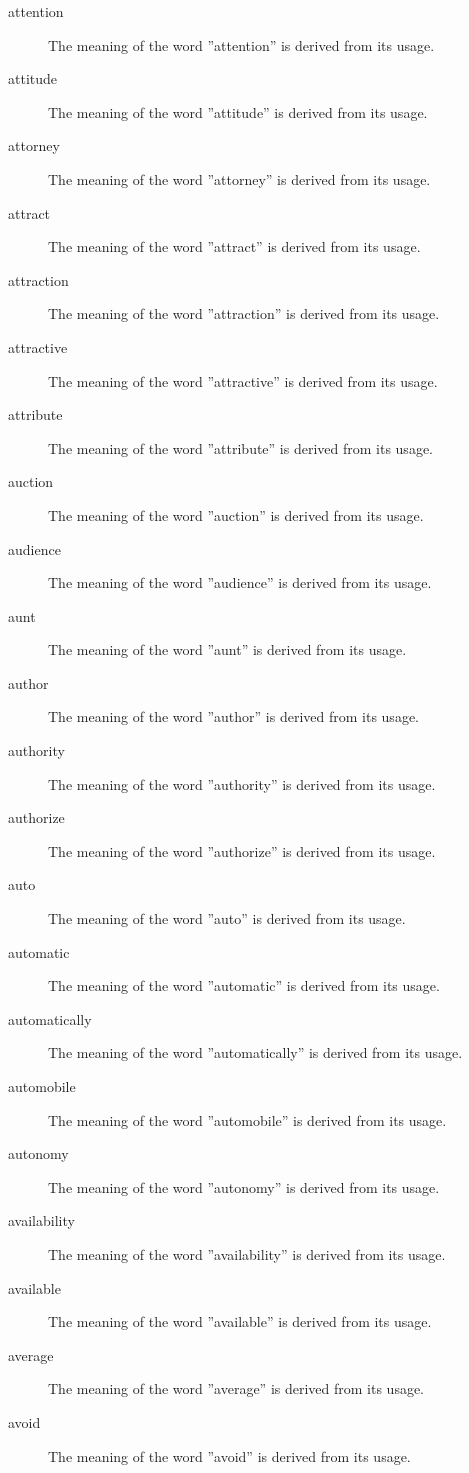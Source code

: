 \documentclass[12pt, letterpaper]{memoir}
\begin{document}
\begin{description}
\item[attention] The meaning of the word ''attention'' is derived from its usage.
\item[attitude] The meaning of the word ''attitude'' is derived from its usage.
\item[attorney] The meaning of the word ''attorney'' is derived from its usage.
\item[attract] The meaning of the word ''attract'' is derived from its usage.
\item[attraction] The meaning of the word ''attraction'' is derived from its usage.
\item[attractive] The meaning of the word ''attractive'' is derived from its usage.
\item[attribute] The meaning of the word ''attribute'' is derived from its usage.
\item[auction] The meaning of the word ''auction'' is derived from its usage.
\item[audience] The meaning of the word ''audience'' is derived from its usage.
\item[aunt] The meaning of the word ''aunt'' is derived from its usage.
\item[author] The meaning of the word ''author'' is derived from its usage.
\item[authority] The meaning of the word ''authority'' is derived from its usage.
\item[authorize] The meaning of the word ''authorize'' is derived from its usage.
\item[auto] The meaning of the word ''auto'' is derived from its usage.
\item[automatic] The meaning of the word ''automatic'' is derived from its usage.
\item[automatically] The meaning of the word ''automatically'' is derived from its usage.
\item[automobile] The meaning of the word ''automobile'' is derived from its usage.
\item[autonomy] The meaning of the word ''autonomy'' is derived from its usage.
\item[availability] The meaning of the word ''availability'' is derived from its usage.
\item[available] The meaning of the word ''available'' is derived from its usage.
\item[average] The meaning of the word ''average'' is derived from its usage.
\item[avoid] The meaning of the word ''avoid'' is derived from its usage.

\end{description}
\end{document}
